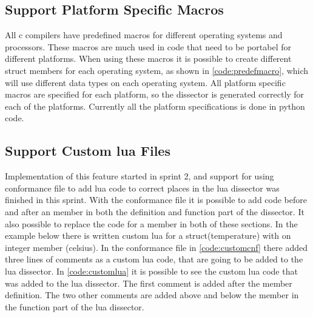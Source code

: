 \subsection{Support Platform Specific Macros}
All \Gls{c} compilers have predefined macros for different operating systems and 
processors. These macros are much used in code that need to be portabel for 
different platforms. When using these macros it is possible to create 
different \gls{struct} \glspl{member} for each operating system, as shown in 
\autoref{code:predefmacro}, which will use different data types on each 
operating system. All platform specific macros are specified for each 
platform, so the \gls{dissector} is generated correctly for each of the platforms. 
Currently all the platform specifications is done in \Gls{python} code.



\subsection{Support Custom \Gls{lua} Files}
Implementation of this feature started in sprint 2, and support for using 
conformance file to add \Gls{lua} code to correct places in the \Gls{lua} \gls{dissector} was 
finished in this sprint. With the conformance file it is possible to add code 
before and after an \gls{member} in both the definition and function part of the 
\gls{dissector}. It also possible to replace the code for a \gls{member} in both of these 
sections. In the example below there is written custom \Gls{lua} for a 
\gls{struct}(temperature) with on \gls{integer} \gls{member} (celsius). In the conformance file 
in \autoref{code:customcnf} there added three lines of comments as a custom 
\Gls{lua} code, that are going to be added to the \Gls{lua} \gls{dissector}. In 
\autoref{code:customlua} it is possible to see the custom \Gls{lua} code that was 
added to the \Gls{lua} \gls{dissector}. The first comment is added after the \gls{member} 
definition. The two other comments are added above and below the \gls{member} in the 
function part of the \Gls{lua} \gls{dissector}.





